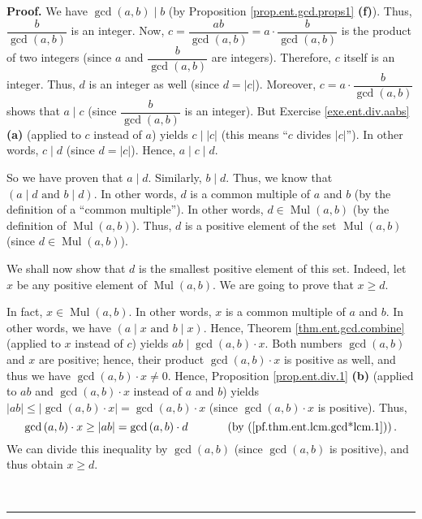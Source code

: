 \documentclass[numbers=enddot,12pt,final,onecolumn,notitlepage]{scrartcl}%
\numberwithin{exer}{subsection}
\theoremstyle{definition}
\newenvironment{proof}[1][Proof]{\noindent\textbf{#1.} }{\ \rule{0.5em}{0.5em}}
\begin{document}
\begin{proof}
We have $\gcd\left(  a,b\right)  \mid b$ (by Proposition
\ref{prop.ent.gcd.props1} \textbf{(f)}). Thus, $\dfrac{b}{\gcd\left(
a,b\right)  }$ is an integer. Now, $c=\dfrac{ab}{\gcd\left(  a,b\right)
}=a\cdot\dfrac{b}{\gcd\left(  a,b\right)  }$ is the product of two integers
(since $a$ and $\dfrac{b}{\gcd\left(  a,b\right)  }$ are integers). Therefore,
$c$ itself is an integer. Thus, $d$ is an integer as well (since $d=\left\vert
c\right\vert $). Moreover, $c=a\cdot\dfrac{b}{\gcd\left(  a,b\right)  }$ shows
that $a\mid c$ (since $\dfrac{b}{\gcd\left(  a,b\right)  }$ is an integer).
But Exercise \ref{exe.ent.div.aabs} \textbf{(a)} (applied to $c$ instead of
$a$) yields $c\mid\left\vert c\right\vert $ (this means \textquotedblleft$c$
divides $\left\vert c\right\vert $\textquotedblright). In other words, $c\mid
d$ (since $d=\left\vert c\right\vert $). Hence, $a\mid c\mid d$.

So we have proven that $a\mid d$. Similarly, $b\mid d$. Thus, we know that
$\left(  a\mid d\text{ and }b\mid d\right)  $. In other words, $d$ is a common
multiple of $a$ and $b$ (by the definition of a \textquotedblleft common
multiple\textquotedblright). In other words, $d\in\operatorname*{Mul}\left(
a,b\right)  $ (by the definition of $\operatorname*{Mul}\left(  a,b\right)
$). Thus, $d$ is a positive element of the set $\operatorname*{Mul}\left(
a,b\right)  $ (since $d\in\operatorname*{Mul}\left(  a,b\right)  $).

We shall now show that $d$ is the smallest positive element of this set.
Indeed, let $x$ be any positive element of $\operatorname*{Mul}\left(
a,b\right)  $. We are going to prove that $x\geq d$.

In fact, $x\in\operatorname*{Mul}\left(  a,b\right)  $. In other words, $x$ is
a common multiple of $a$ and $b$. In other words, we have $\left(  a\mid
x\text{ and }b\mid x\right)  $. Hence, Theorem \ref{thm.ent.gcd.combine}
(applied to $x$ instead of $c$) yields $ab\mid\gcd\left(  a,b\right)  \cdot
x$. Both numbers $\gcd\left(  a,b\right)  $ and $x$ are positive; hence, their
product $\gcd\left(  a,b\right)  \cdot x$ is positive as well, and thus we
have $\gcd\left(  a,b\right)  \cdot x\neq0$. Hence, Proposition
\ref{prop.ent.div.1} \textbf{(b)} (applied to $ab$ and $\gcd\left(
a,b\right)  \cdot x$ instead of $a$ and $b$) yields $\left\vert ab\right\vert
\leq\left\vert \gcd\left(  a,b\right)  \cdot x\right\vert =\gcd\left(
a,b\right)  \cdot x$ (since $\gcd\left(  a,b\right)  \cdot x$ is positive).
Thus,%
\[
\gcd\left(  a,b\right)  \cdot x\geq\left\vert ab\right\vert =\gcd\left(
a,b\right)  \cdot d\ \ \ \ \ \ \ \ \ \ \left(  \text{by
(\ref{pf.thm.ent.lcm.gcd*lcm.1})}\right)  .
\]
We can divide this inequality by $\gcd\left(  a,b\right)  $ (since
$\gcd\left(  a,b\right)  $ is positive), and thus obtain $x\geq d$.


\end{proof}
\end{document}

